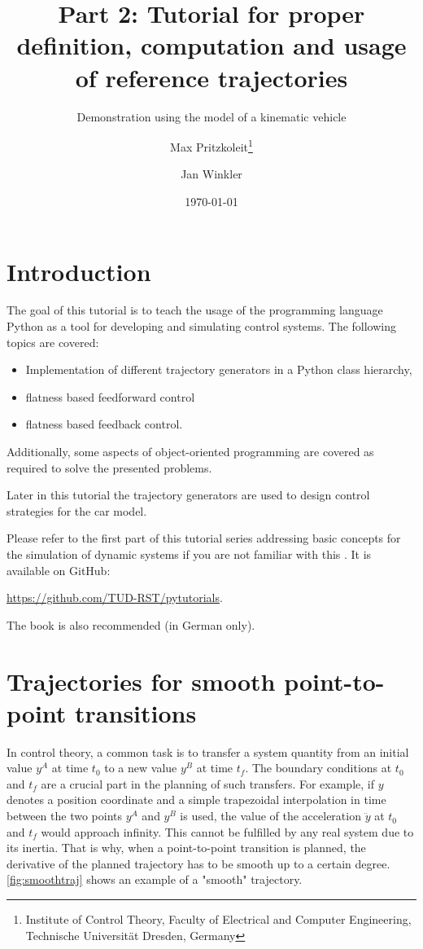 \documentclass[a4paper,12pt,headinclude=true,headsepline,parskip=half,DIV=12]{scrartcl}
\title{Part 2: Tutorial for proper definition, computation and usage of reference trajectories}
\subtitle{Demonstration using the model of a kinematic vehicle}
\author{Max Pritzkoleit\thanks{Institute of Control Theory, Faculty of Electrical and Computer Engineering, Technische Universität Dresden, Germany} \and Jan Winkler\footnotemark[1]}
\date{\today}
\newcommand{\py}{Python\xspace}
\begin{document}
\maketitle%

\tableofcontents

\newpage

\section{Introduction}
The goal of this tutorial is to teach the usage of the programming language \py as a tool for developing and simulating control systems. The following topics are covered:
\begin{itemize}
  \item Implementation of different trajectory generators in a \py class hierarchy,
  \item flatness based feedforward control
  \item flatness based feedback control.
\end{itemize}
Additionally, some aspects of object-oriented programming are covered as required to solve the presented problems.

Later in this tutorial the trajectory generators are used to design control strategies for the car model.

Please refer to the first part of this tutorial series addressing basic concepts for the simulation of dynamic systems if you are not familiar with this \cite{Tut1}. It is available on GitHub:
\begin{center}
  \href{https://github.com/TUD-RST/pytutorials}{https://github.com/TUD-RST/pytutorials}.
\end{center}
The book \cite{KnollPython21} is also recommended (in German only).



\section{Trajectories for smooth point-to-point transitions}
In control theory, a common task is to transfer a system quantity from an initial value $y^A$ at time $t_0$ to a new value $y^B$ at time $t_f$. The boundary conditions at $t_0$ and $t_f$ are a crucial part in the planning of such transfers. For example, if $y$ denotes a position coordinate and a simple trapezoidal interpolation in time between the two points $y^A$ and $y^B$ is used, the value of the acceleration $\ddot y$ at $t_0$ and $t_f$ would approach infinity. This cannot be fulfilled by any real system due to its inertia. That is why, when a point-to-point transition is planned, the derivative of the planned trajectory has to be smooth up to a certain degree. \autoref{fig:smoothtraj} shows an example of a "smooth" trajectory.
\end{document}
